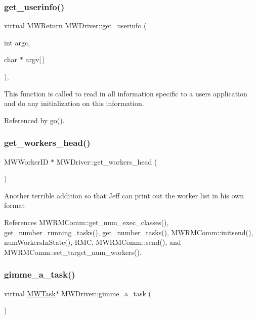 \subsubsection{\texorpdfstring{get\+\_\+userinfo()}{get\_userinfo()}}
{\footnotesize\ttfamily virtual M\+W\+Return M\+W\+Driver\+::get\+\_\+userinfo (\begin{DoxyParamCaption}\item[{int}]{argc,  }\item[{char $\ast$}]{argv\mbox{[}$\,$\mbox{]} }\end{DoxyParamCaption})\hspace{0.3cm}{\ttfamily [protected]}, {}}

This function is called to read in all information specific to a user\textquotesingle{}s application and do any initialization on this information. 

Referenced by go().

\mbox{\label{classMWDriver_a08d81fbcaa68a8fb4ec11afcd81abc1b}} 
\subsubsection{\texorpdfstring{get\+\_\+workers\+\_\+head()}{get\_workers\_head()}}
{\footnotesize\ttfamily M\+W\+Worker\+ID $\ast$ M\+W\+Driver\+::get\+\_\+workers\+\_\+head (\begin{DoxyParamCaption}{ }\end{DoxyParamCaption})}

Another terrible addition so that Jeff can print out the worker list in his own format 

References M\+W\+R\+M\+Comm\+::get\+\_\+num\+\_\+exec\+\_\+classes(), get\+\_\+number\+\_\+running\+\_\+tasks(), get\+\_\+number\+\_\+tasks(), M\+W\+R\+M\+Comm\+::initsend(), num\+Workers\+In\+State(), R\+MC, M\+W\+R\+M\+Comm\+::send(), and M\+W\+R\+M\+Comm\+::set\+\_\+target\+\_\+num\+\_\+workers().

\mbox{\label{classMWDriver_a7d37eab370800bcc1fed37bff6c92643}} 
\subsubsection{\texorpdfstring{gimme\+\_\+a\+\_\+task()}{gimme\_a\_task()}}
{\footnotesize\ttfamily virtual \hyperlink{classMWTask}{M\+W\+Task}$\ast$ M\+W\+Driver\+::gimme\+\_\+a\+\_\+task (\begin{DoxyParamCaption}{ }\end{DoxyParamCaption})\hspace{0.3cm}{\ttfamily [pure virtual]}}

